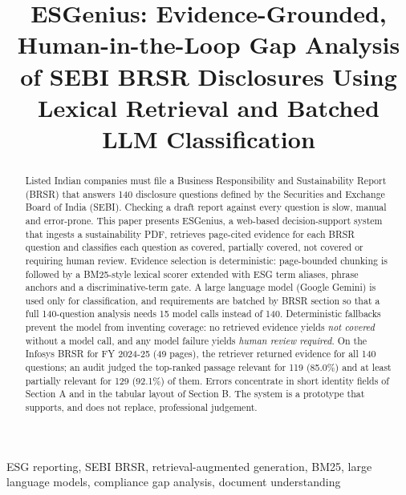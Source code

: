 \documentclass[conference]{IEEEtran}
\begin{document}
\title{ESGenius: Evidence-Grounded, Human-in-the-Loop Gap Analysis of SEBI BRSR Disclosures Using Lexical Retrieval and Batched LLM Classification}
\author{ \and {} \and {} \and {}}
\maketitle
\begin{abstract}Listed Indian companies must file a Business Responsibility and Sustainability Report (BRSR) that answers 140 disclosure questions defined by the Securities and Exchange Board of India (SEBI). Checking a draft report against every question is slow, manual and error-prone. This paper presents ESGenius, a web-based decision-support system that ingests a sustainability PDF, retrieves page-cited evidence for each BRSR question and classifies each question as covered, partially covered, not covered or requiring human review. Evidence selection is deterministic: page-bounded chunking is followed by a BM25-style lexical scorer extended with ESG term aliases, phrase anchors and a discriminative-term gate. A large language model (Google Gemini) is used only for classification, and requirements are batched by BRSR section so that a full 140-question analysis needs 15 model calls instead of 140. Deterministic fallbacks prevent the model from inventing coverage: no retrieved evidence yields \textit{not covered} without a model call, and any model failure yields \textit{human review required}. On the Infosys BRSR for FY 2024-25 (49 pages), the retriever returned evidence for all 140 questions; an audit judged the top-ranked passage relevant for 119 (85.0\%) and at least partially relevant for 129 (92.1\%) of them. Errors concentrate in short identity fields of Section A and in the tabular layout of Section B. The system is a prototype that supports, and does not replace, professional judgement.\end{abstract}
\begin{IEEEkeywords}ESG reporting, SEBI BRSR, retrieval-augmented generation, BM25, large language models, compliance gap analysis, document understanding\end{IEEEkeywords}
\end{document}
